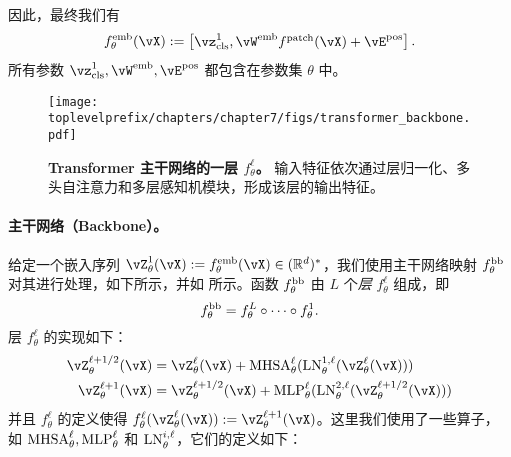 \documentclass[../../book-main.tex]{subfiles}
\begin{document}
因此，最终我们有
\begin{equation}\label{eq:definition_of_embedding_module}
    f_{\theta}^{\emb}(\vX) := \mat{\vz_{\cls}^{1}, \vW^{\emb}f^{\patch}(\vX) + \vE^{\pos}}.
\end{equation}
所有参数 \(\vz_{\cls}^{1}, \vW^{\emb}, \vE^{\pos}\) 都包含在参数集 \(\theta\) 中。

\begin{figure}
    \centering 
    \texttt{[image: \\toplevelprefix/chapters/chapter7/figs/transformer\_backbone.pdf]}
    \caption{\small\textbf{Transformer 主干网络的一层 \(f_{\theta}^{\ell}\)。} 输入特征依次通过层归一化、多头自注意力和多层感知机模块，形成该层的输出特征。}
    \label{fig:transformer_backbone}
\end{figure}

\paragraph{主干网络（Backbone）。} 给定一个嵌入序列 \(\vZ_{\theta}^{1}(\vX) := f_{\theta}^{\emb}(\vX) \in (\R^{d})^{*}\)，我们使用主干网络映射 \(f_{\theta}^{\mathrm{bb}}\) 对其进行处理，如下所示，并如  所示。函数 \(f_{\theta}^{\mathrm{bb}}\) 由 \(L\) 个\textit{层} \(f_{\theta}^{\ell}\) 组成，即
\begin{equation}
    f_{\theta}^{\mathrm{bb}} = f_{\theta}^{L} \circ \cdots \circ f_{\theta}^{1}.
\end{equation}
 层 \(f_{\theta}^{\ell}\) 的实现如下：
\begin{align}\label{eq:vit-res-block}
    \vZ_{\theta}^{\ell + 1/2}(\vX)
    &= \vZ_{\theta}^{\ell}(\vX) + \MHSA_{\theta}^{\ell}(\LN_{\theta}^{1, \ell}(\vZ_{\theta}^{\ell}(\vX))) \\ 
    \vZ_{\theta}^{\ell + 1}(\vX)
    &= \vZ_{\theta}^{\ell + 1/2}(\vX) + \MLP_{\theta}^{\ell}(\LN_{\theta}^{2, \ell}(\vZ_{\theta}^{\ell + 1/2}(\vX)))
\end{align}
并且 \(f_{\theta}^{\ell}\) 的定义使得 \(f_{\theta}^{\ell}(\vZ_{\theta}^{\ell}(\vX)) := \vZ_{\theta}^{\ell + 1}(\vX)\)。这里我们使用了一些算子，如 \(\operatorname{MHSA}_{\theta}^{\ell}, \operatorname{MLP}_{\theta}^{\ell}\) 和 \(\operatorname{LN}_{\theta}^{i, \ell}\)，它们的定义如下：
\end{document}
